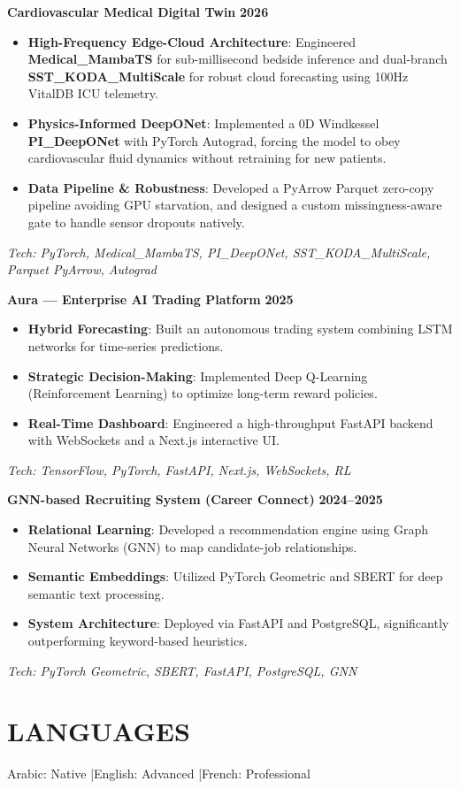 \documentclass[a4paper,12pt]{article}
\begin{document}
\noindent\textbf{\large Cardiovascular Medical Digital Twin} \hfill \textbf{2026}
\vspace{2pt}
{\small
\begin{itemize}
    \item \textbf{High-Frequency Edge-Cloud Architecture}: Engineered \textbf{Medical\_MambaTS} for sub-millisecond bedside inference and dual-branch \textbf{SST\_KODA\_MultiScale} for robust cloud forecasting using 100Hz VitalDB ICU telemetry.
    \item \textbf{Physics-Informed DeepONet}: Implemented a 0D Windkessel \textbf{PI\_DeepONet} with PyTorch Autograd, forcing the model to obey cardiovascular fluid dynamics without retraining for new patients.
    \item \textbf{Data Pipeline \& Robustness}: Developed a PyArrow Parquet zero-copy pipeline avoiding GPU starvation, and designed a custom missingness-aware gate to handle sensor dropouts natively.
\end{itemize}
\textit{Tech: PyTorch, Medical\_MambaTS, PI\_DeepONet, SST\_KODA\_MultiScale, Parquet PyArrow, Autograd}
}
\vspace{8pt}

\noindent\textbf{\large Aura — Enterprise AI Trading Platform} \hfill \textbf{2025}
\vspace{2pt}
{\small
\begin{itemize}
    \item \textbf{Hybrid Forecasting}: Built an autonomous trading system combining LSTM networks for time-series predictions.
    \item \textbf{Strategic Decision-Making}: Implemented Deep Q-Learning (Reinforcement Learning) to optimize long-term reward policies.
    \item \textbf{Real-Time Dashboard}: Engineered a high-throughput FastAPI backend with WebSockets and a Next.js interactive UI.
\end{itemize}
\textit{Tech: TensorFlow, PyTorch, FastAPI, Next.js, WebSockets, RL}
}
\vspace{8pt}

\noindent\textbf{\large GNN-based Recruiting System (Career Connect)} \hfill \textbf{2024--2025}
\vspace{2pt}
{\small
\begin{itemize}
    \item \textbf{Relational Learning}: Developed a recommendation engine using Graph Neural Networks (GNN) to map candidate-job relationships.
    \item \textbf{Semantic Embeddings}: Utilized PyTorch Geometric and SBERT for deep semantic text processing.
    \item \textbf{System Architecture}: Deployed via FastAPI and PostgreSQL, significantly outperforming keyword-based heuristics.
\end{itemize}
\textit{Tech: PyTorch Geometric, SBERT, FastAPI, PostgreSQL, GNN}
}
\vspace{12pt}

\section{LANGUAGES}
Arabic: Native \quad|\quad English: Advanced \quad|\quad French: Professional
\end{document}
